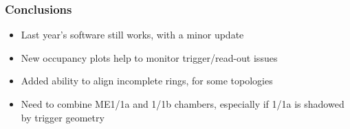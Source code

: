 \documentclass[compress]{beamer}
\begin{document}

\begin{frame}
\frametitle{Conclusions}
\begin{itemize}\setlength{\itemsep}{0.5 cm}
\item Last year's software still works, with a minor update
\item New occupancy plots help to monitor trigger/read-out issues
\item Added ability to align incomplete rings, for some topologies
\item Need to combine ME1/1a and 1/1b chambers, especially if 1/1a is shadowed by trigger geometry
\end{itemize}
\label{numpages}
\end{frame}
\end{document}
